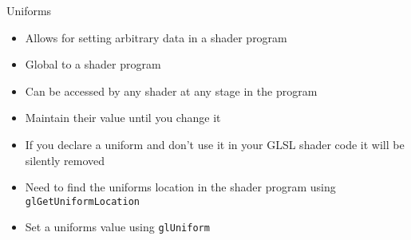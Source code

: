 \documentclass{beamer}
\begin{document}
\begin{frame}[fragile]{Uniforms}
    \begin{itemize}
        \item Allows for setting arbitrary data in a shader program
        \item Global to a shader program
        \item Can be accessed by any shader at any stage in the program
        \item Maintain their value until you change it
        \item If you declare a uniform and don't use it in your GLSL shader code it will be silently removed
        \item Need to find the uniforms location in the shader program using {\color{blue}\verb"glGetUniformLocation"}
        \item Set a uniforms value using {\color{blue}\verb"glUniform"}
    \end{itemize}
\end{frame}
\end{document}
